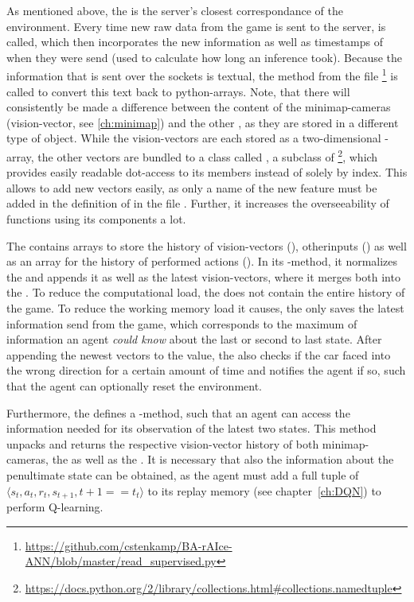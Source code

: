 As mentioned above, the  is the server's closest correspondance of the environment. Every time new raw data from the game is sent to the server,  is called, which then incorporates the new information as well as timestamps of when they were send (used to calculate how long an inference took). Because the information that is sent over the sockets is textual, the method  from the file \footnote{\url{https://github.com/cstenkamp/BA-rAIce-ANN/blob/master/read_supervised.py}} is called to convert this text back to python-arrays. Note, that there will consistently be made a difference between the content of the minimap-cameras (vision-vector, see \ref{ch:minimap}) and the other , as they are stored in a different type of object. While the vision-vectors are each stored as a two-dimensional -array, the other vectors are bundled to a class called , a subclass of  \footnote{\url{https://docs.python.org/2/library/collections.html#collections.namedtuple}}, which provides easily readable dot-access to its members instead of solely by index. This allows to add new vectors easily, as only a name of the new feature must be added in the definition of  in the file . Further, it increases the overseeability of functions using its components a lot.

The  contains arrays to store the history of vision-vectors (), otherinputs () as well as an array for the history of performed actions (). In its -method, it normalizes the  and appends it as well as the latest vision-vectors, where it merges both into the .
To reduce the computational load, the  does not contain the entire history of the game. To reduce the working memory load it causes, the  only saves the latest information send from the game, which corresponds to the maximum of information an agent \textit{could know} about the last or second to last state. After appending the newest vectors to the value, the  also checks if the car faced into the wrong direction for a certain amount of time and notifies the agent if so, such that the agent can optionally reset the environment.

Furthermore, the  defines a -method, such that an agent can access the information needed for its observation of the latest two states. This method unpacks and returns the respective vision-vector history of both minimap-cameras, the  as well as the . It is necessary that also the information about the penultimate state can be obtained, as the agent must add a full tuple of $\langle s_t, a_t, r_t, s_{t+1}, t+1==t_t \rangle$ to its replay memory (see chapter~\ref{ch:DQN}) to perform Q-learning. 

